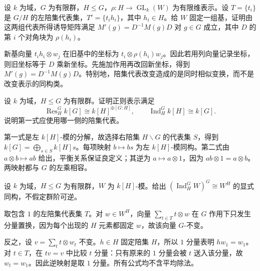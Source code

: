 \begin{exercise}\label{b5:ex:03-representative-change}
	设 \(k\) 为域，\(G\) 为有限群，\(H\le G\)，\(\rho:H\to\operatorname{GL}_k(W)\) 为有限维表示。设 \(T=\{t_i\}\) 是 \(G/H\) 的左陪集代表集，\(T'=\{t_ih_i\}\)，其中 \(h_i\in H\)。给 \(W\) 固定一组基，证明由这两组代表所得诱导矩阵满足 \(M'(g)=D^{-1}M(g)D\) 对 \(g\in G\) 成立，其中 \(D\) 的第 \(i\) 个对角块为 \(\rho(h_i)\)。
\end{exercise}
\begin{solution}
	新基向量 \(t_ih_i\otimes w_j\) 在旧基中的坐标为 \(t_i\otimes\rho(h_i)w_j\)。因此若用列向量记录坐标，则旧坐标等于 \(D\) 乘新坐标。先施加作用再改回新坐标，得到 \(M'(g)=D^{-1}M(g)D\)。特别地，陪集代表改变造成的是同时相似变换，而不是改变表示的同构类。
\end{solution}

\begin{exercise}\label{b5:ex:03-regular-restriction}
	设 \(k\) 为域，\(H\le G\) 为有限群。证明正则表示满足
	\[
		\operatorname{Res}_H^G k[G]\cong k[H]^{\oplus[G:H]}, \qquad \operatorname{Ind}_H^G k[H]\cong k[G].
	\]
	说明第一式应使用哪一侧的陪集代表。
\end{exercise}
\begin{solution}
	第一式是左 \(k[H]\)-模的分解，故选择右陪集 \(H\backslash G\) 的代表集 \(S\)，得到 \(k[G]=\bigoplus_{s\in S}k[H]s\)。每项映射 \(b\mapsto bs\) 为左 \(k[H]\)-模同构。第二式由 \(a\otimes b\mapsto ab\) 给出，平衡关系保证良定义；其逆为 \(a\mapsto a\otimes1\)，因为 \(ab\otimes1=a\otimes b\)。两映射都与 \(G\) 的左乘相容。
\end{solution}

\begin{exercise}\label{b5:ex:03-induced-invariants}
	设 \(k\) 为域，\(H\le G\) 为有限群，\(W\) 为 \(k[H]\)-模。给出 \((\operatorname{Ind}_H^G W)^G\cong W^H\) 的显式同构，不假定群阶可逆。
\end{exercise}
\begin{solution}
	取包含 \(1\) 的左陪集代表集 \(T\)。对 \(w\in W^H\)，向量 \(\sum_{t\in T}t\otimes w\) 在 \(G\) 作用下只发生分量置换，因为每个出现的 \(H\) 元素都固定 \(w\)，故该向量 \(G\)-不变。

	反之，设 \(v=\sum_t t\otimes w_t\) 不变。\(h\in H\) 固定陪集 \(H\)，所以 \(1\) 分量表明 \(hw_1=w_1\)。对 \(t\in T\)，在 \(tv=v\) 中比较 \(t\) 分量：只有原来的 \(1\) 分量会被 \(t\) 送入该分量，故 \(w_t=w_1\)。因此逆映射是取 \(1\) 分量。所有公式均不含平均除法。
\end{solution}

